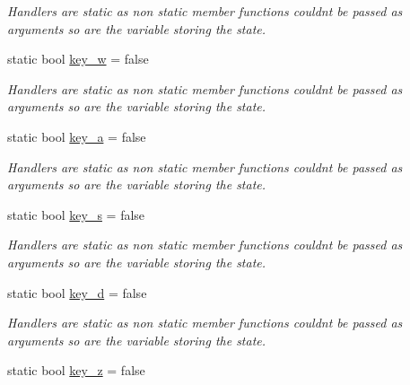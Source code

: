 \begin{DoxyCompactItemize}
\begin{DoxyCompactList}\small\item\em Handlers are static as non static member functions couldn\textquotesingle{}t be passed as arguments so are the variable storing the state. \end{DoxyCompactList}\item 
static bool \hyperlink{classcft_1_1Scene_a8ad6e3c1f0836e1d581d91533e74807d}{key\+\_\+w} = false\hypertarget{classcft_1_1Scene_a8ad6e3c1f0836e1d581d91533e74807d}{}\label{classcft_1_1Scene_a8ad6e3c1f0836e1d581d91533e74807d}

\begin{DoxyCompactList}\small\item\em Handlers are static as non static member functions couldn\textquotesingle{}t be passed as arguments so are the variable storing the state. \end{DoxyCompactList}\item 
static bool \hyperlink{classcft_1_1Scene_afdb2bbadde24b50b93347ca93954485f}{key\+\_\+a} = false\hypertarget{classcft_1_1Scene_afdb2bbadde24b50b93347ca93954485f}{}\label{classcft_1_1Scene_afdb2bbadde24b50b93347ca93954485f}

\begin{DoxyCompactList}\small\item\em Handlers are static as non static member functions couldn\textquotesingle{}t be passed as arguments so are the variable storing the state. \end{DoxyCompactList}\item 
static bool \hyperlink{classcft_1_1Scene_a1d9c8a2ca27e0789f5eef6f5a5ef822f}{key\+\_\+s} = false\hypertarget{classcft_1_1Scene_a1d9c8a2ca27e0789f5eef6f5a5ef822f}{}\label{classcft_1_1Scene_a1d9c8a2ca27e0789f5eef6f5a5ef822f}

\begin{DoxyCompactList}\small\item\em Handlers are static as non static member functions couldn\textquotesingle{}t be passed as arguments so are the variable storing the state. \end{DoxyCompactList}\item 
static bool \hyperlink{classcft_1_1Scene_a556673b51bac7161bb9b4a2c8c1d4883}{key\+\_\+d} = false\hypertarget{classcft_1_1Scene_a556673b51bac7161bb9b4a2c8c1d4883}{}\label{classcft_1_1Scene_a556673b51bac7161bb9b4a2c8c1d4883}

\begin{DoxyCompactList}\small\item\em Handlers are static as non static member functions couldn\textquotesingle{}t be passed as arguments so are the variable storing the state. \end{DoxyCompactList}\item 
static bool \hyperlink{classcft_1_1Scene_ac30ebecf44c9e90211547758484eff17}{key\+\_\+z} = false\hypertarget{classcft_1_1Scene_ac30ebecf44c9e90211547758484eff17}{}\label{classcft_1_1Scene_ac30ebecf44c9e90211547758484eff17}


\end{DoxyCompactItemize}
